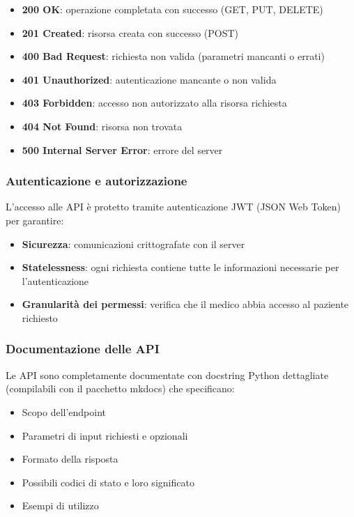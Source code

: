 \documentclass[12pt,a4paper,oneside]{report}
\begin{document}
\begin{itemize}
    \item \textbf{200 OK}: operazione completata con successo (GET, PUT, DELETE)
    \item \textbf{201 Created}: risorsa creata con successo (POST)
    \item \textbf{400 Bad Request}: richiesta non valida (parametri mancanti o errati)
    \item \textbf{401 Unauthorized}: autenticazione mancante o non valida
    \item \textbf{403 Forbidden}: accesso non autorizzato alla risorsa richiesta
    \item \textbf{404 Not Found}: risorsa non trovata
    \item \textbf{500 Internal Server Error}: errore del server
\end{itemize}

\subsubsection{Autenticazione e autorizzazione}
L'accesso alle API è protetto tramite autenticazione JWT (JSON Web Token) per garantire:

\begin{itemize}
    \item \textbf{Sicurezza}: comunicazioni crittografate con il server
    \item \textbf{Statelessness}: ogni richiesta contiene tutte le informazioni necessarie per l'autenticazione
    \item \textbf{Granularità dei permessi}: verifica che il medico abbia accesso al paziente richiesto
\end{itemize}

\subsubsection{Documentazione delle API}
Le API sono completamente documentate con docstring Python dettagliate (compilabili con il pacchetto mkdocs) che specificano:

\begin{itemize}
    \item Scopo dell'endpoint
    \item Parametri di input richiesti e opzionali
    \item Formato della risposta
    \item Possibili codici di stato e loro significato
    \item Esempi di utilizzo
\end{itemize}
\end{document}
